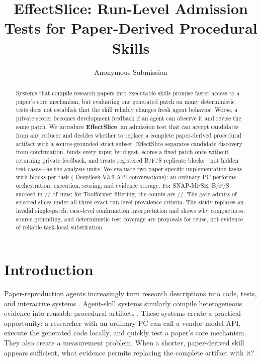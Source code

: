 \documentclass[letterpaper]{article} %
\title{EffectSlice: Run-Level Admission Tests for Paper-Derived Procedural Skills}
\author{Anonymous Submission}
\begin{document}
\maketitle

\begin{abstract}
Systems that compile research papers into executable skills promise faster
access to a paper's core mechanism, but evaluating one generated patch on many
deterministic tests does not establish that the skill reliably changes fresh
agent behavior.  Worse, a private scorer becomes development feedback if an
agent can observe it and revise the same patch.  We introduce
\textbf{EffectSlice}, an admission test that can accept candidates from any
reducer and decides whether to replace a complete
paper-derived procedural artifact with a source-grounded strict subset.
EffectSlice separates candidate discovery from confirmation, binds every input
by digest, scores a fixed patch once without returning private feedback, and
treats registered B/F/S replicate blocks---not hidden test cases---as the
analysis units.  We evaluate two paper-specific implementation tasks with
\EffectSliceReplicatesPerTask{} blocks per task
(\EffectSliceProviderConversations{} DeepSeek V3.2 API conversations); an
ordinary PC performs orchestration, execution, scoring, and evidence storage.
For SNAP-MFSE, B/F/S succeed in
\SnapMFSEBSuccesses/\SnapMFSEFSuccesses/\SnapMFSESSuccesses{} of
\EffectSliceReplicatesPerTask{} runs; for Toolformer filtering, the counts are
\ToolformerFilterBSuccesses/\ToolformerFilterFSuccesses/\ToolformerFilterSSuccesses.
The gate admits \EffectSliceAdmissions{} of \EffectSliceTaskCount{} selected
slices under all three exact run-level prevalence criteria.  The study replaces an invalid
single-patch, case-level confirmation interpretation and shows why compactness,
source grounding, and deterministic test coverage are proposals for reuse, not
evidence of reliable task-local substitution.
\end{abstract}

\section{Introduction}

Paper-reproduction agents increasingly turn research descriptions into code,
tests, and interactive systems \cite{starace2025paperbench,
zhao2025autoreproduce,miao2025paper2agent}.  Agent-skill systems similarly
compile heterogeneous evidence into reusable procedural artifacts
\cite{shen2026skillfoundry,pan2026anything2skill}.  These systems create a
practical opportunity: a researcher with an ordinary PC can call a vendor model
API, execute the generated code locally, and quickly test a paper's core
mechanism.  They also create a measurement problem.  When a shorter,
paper-derived skill appears sufficient, what evidence permits replacing the
complete artifact with it?
\end{document}

